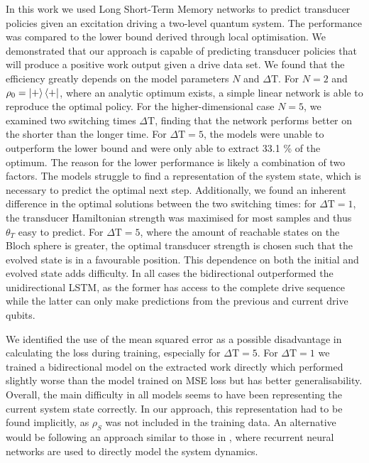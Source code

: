 In this work we used Long Short-Term Memory networks to predict transducer policies given an excitation driving a two-level quantum system.
The performance was compared to the lower bound derived through local optimisation.
We demonstrated that our approach is capable of predicting transducer policies that will produce a positive work output given a drive data set.
We found that the efficiency greatly depends on the model parameters $N$ and $\Delta \mathrm{T}$.
For $N=2$ and $\rho_0 = \ket{+}\bra{+}$, where an analytic optimum exists, a simple linear network is able to reproduce the optimal policy.
For the higher-dimensional case $N=5$, we examined two switching times $\Delta \mathrm{T}$, finding that the network performs better on the shorter than the longer time.
For $\Delta \mathrm{T} = 5$, the models were unable to outperform the lower bound and were only able to extract 33.1 \% of the optimum.
The reason for the lower performance is likely a combination of two factors.
The models struggle to find a representation of the system state, which is necessary to predict the optimal next step.
Additionally, we found an inherent difference in the optimal solutions between the two switching times: for $\Delta \mathrm{T} = 1$, the transducer Hamiltonian strength was maximised for most samples and thus $\theta_T$ easy to predict.
For $\Delta \mathrm{T} = 5$, where the amount of reachable states on the Bloch sphere is greater, the optimal transducer strength is chosen such that the evolved state is in a favourable position.
This dependence on both the initial and evolved state adds difficulty.
In all cases the bidirectional outperformed the unidirectional LSTM, as the former has access to the complete drive sequence while the latter can only make predictions from the previous and current drive qubits.

We identified the use of the mean squared error as a possible disadvantage in calculating the loss during training, especially for $\Delta \mathrm{T} = 5$.
For $\Delta \mathrm{T} = 1$ we trained a bidirectional model on the extracted work directly which performed slightly worse than the model trained on MSE loss but has better generalisability.
Overall, the main difficulty in all models seems to have been representing the current system state correctly.
In our approach, this representation had to be found implicitly, as $\rho_S$ was not included in the training data.
An alternative would be following an approach similar to those in \cite{Banchi_2018, PhysRevX.10.011006}, where recurrent neural networks are used to directly model the system dynamics.

